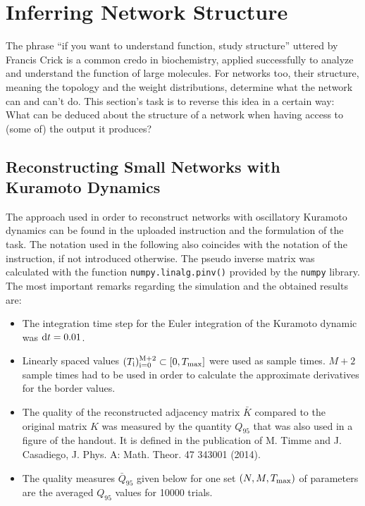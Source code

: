 \documentclass{scrartcl}
\begin{document}
\clearpage
\section{Inferring Network Structure}
The phrase \enquote{if you want to understand function, study structure}
uttered by Francis Crick is a common credo in biochemistry, applied
successfully to analyze and understand the function of large molecules. For
networks too, their structure, meaning the topology and the weight
distributions, determine what the network can and can't do. This section's
task is to reverse this idea in a certain way: What can be deduced about
the structure of a network when having access to (some of) the output it
produces?

\subsection{Reconstructing Small Networks with Kuramoto Dynamics}
The approach used in order to reconstruct networks with oscillatory
Kuramoto dynamics can be found in the uploaded instruction and the
formulation of the task. The notation used in the following also coincides
with the notation of the instruction, if not introduced otherwise. The
pseudo inverse matrix was calculated with the function
\texttt{numpy.linalg.pinv()} provided by the \texttt{numpy} library.
The most important remarks regarding the simulation and the obtained
results are:
\begin{itemize}
    \item The integration time step for the Euler integration of the
        Kuramoto dynamic was $\mathrm{d} t = 0.01$.
    \item Linearly spaced values $(T_{\mathrm{i}})_{\mathrm{i=0}}^{\mathrm{M+2}} \subset [0,
        T_{\mathrm{max}}]$ were used as sample times. $M+2$ sample times had to be
        used in order to calculate the approximate derivatives for the border values. 
    \item The quality of the reconstructed adjacency matrix $\bar{K}$
        compared to the original matrix $K$ was measured by the quantity $Q_{95}$
        that was also used in a figure of the handout. It is defined
        in the publication of M. Timme and J. Casadiego, J. Phys. A: Math.
        Theor. 47 343001 (2014).
    \item The quality measures $\bar{Q}_{95}$ given below for one set $(N,
        M, T_{\mathrm{max}})$ of parameters are the averaged $Q_{95}$ values for
        10000 trials.
\end{itemize}
\end{document}
